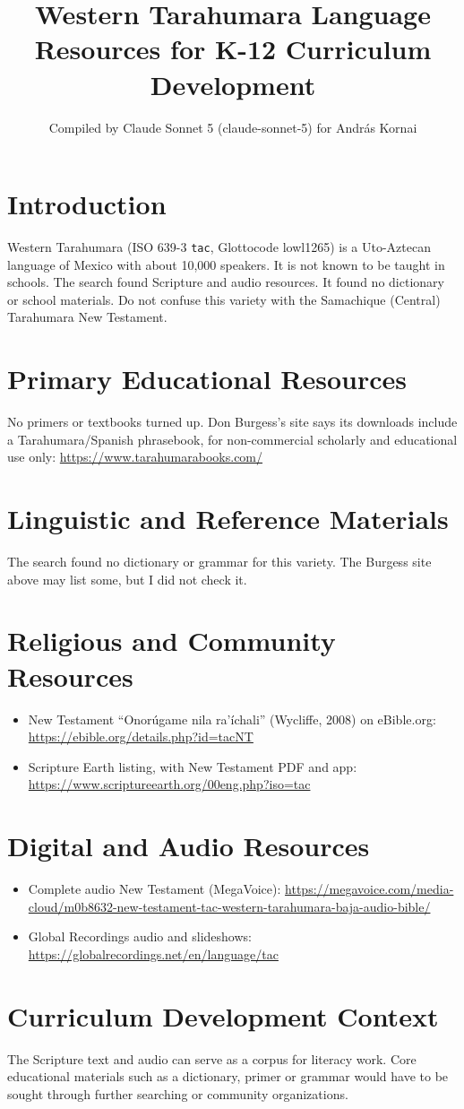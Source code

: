 \documentclass[12pt]{article}
\title{Western Tarahumara Language Resources for K-12 Curriculum Development}
\author{Compiled by Claude Sonnet 5 (claude-sonnet-5) for Andr\'as Kornai}
\date{}
\begin{document}
\maketitle

\section{Introduction}
Western Tarahumara (ISO 639-3 \texttt{tac}, Glottocode lowl1265) is a Uto-Aztecan language of Mexico with about 10,000 speakers. It is not known to be taught in schools. The search found Scripture and audio resources. It found no dictionary or school materials. Do not confuse this variety with the Samachique (Central) Tarahumara New Testament.

\section{Primary Educational Resources}
No primers or textbooks turned up. Don Burgess's site says its downloads include a Tarahumara/Spanish phrasebook, for non-commercial scholarly and educational use only: \url{https://www.tarahumarabooks.com/}

\section{Linguistic and Reference Materials}
The search found no dictionary or grammar for this variety. The Burgess site above may list some, but I did not check it.

\section{Religious and Community Resources}
\begin{itemize}
\item New Testament ``Onorúgame nila ra'íchali'' (Wycliffe, 2008) on eBible.org: \url{https://ebible.org/details.php?id=tacNT}
\item Scripture Earth listing, with New Testament PDF and app: \url{https://www.scriptureearth.org/00eng.php?iso=tac}
\end{itemize}

\section{Digital and Audio Resources}
\begin{itemize}
\item Complete audio New Testament (MegaVoice): \url{https://megavoice.com/media-cloud/m0b8632-new-testament-tac-western-tarahumara-baja-audio-bible/}
\item Global Recordings audio and slideshows: \url{https://globalrecordings.net/en/language/tac}
\end{itemize}

\section{Curriculum Development Context}
The Scripture text and audio can serve as a corpus for literacy work. Core educational materials such as a dictionary, primer or grammar would have to be sought through further searching or community organizations.
\end{document}
